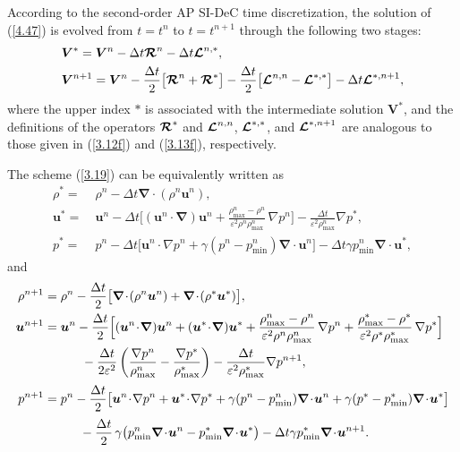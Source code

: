\documentclass[A4paper,12pt,twoside]{article}
\numberwithin{equation}{section}
\numberwithin{figure}{section}
\numberwithin{table}{section}
\def\bnabla{\bm{\nabla}}
\newcommand{\dt}{\Delta t}
\newcommand{\ve}{\varepsilon}
\newcommand\eref[1]{(\ref{#1})}
\begin{document}
According to the second-order AP SI-DeC time discretization, the solution of \eref{4.47} is evolved from $t=t^n$ to $t=t^{n+1}$ through the
following two stages:
\begin{equation}
\begin{aligned}
&\bm V^*=\bm V^n-\dt\bm{{\cal R}}^n-\dt\bm{{\cal L}}^{n,*},\\
&\bm V^{n+1}=\bm V^n-\frac{\dt}{2}\big[\bm{{\cal R}}^n+\bm{{\cal R}}^*\big]-\frac{\dt}{2}\big[\bm{{\cal L}}^{n,n}-\bm{{\cal L}}^{*,*}\big]
-\dt\bm{{\cal L}}^{*,n+1},
\end{aligned}
\label{3.19}
\end{equation}
where the upper index $*$ is associated with the intermediate solution $\bm V^*$, and the definitions of the operators $\bm{{\cal R}}^*$ and
$\bm{{\cal L}}^{n,n}$, $\bm{{\cal L}}^{*,*}$, and $\bm{{\cal L}}^{*,n+1}$ are analogous to those given in \eref{3.12f} and \eref{3.13f},
respectively.

The scheme \eref{3.19} can be equivalently written as
\begin{equation}
\begin{aligned}
\rho^*=&~\rho^n-\dt\bnabla\!\cdot\!(\rho^n\bm u^n),\\
\bm u^*=&~\bm u^n-\dt\Big[(\bm u^n\!\cdot\!\bnabla)\bm u^n+\frac{\rho_{\max}^n-\rho^n}{\ve^2\rho^n\rho_{\max}^n}\,\nabla p^n\Big]-
\frac{\dt}{\ve^2\rho_{\max}^n}\nabla p^*,\\
p^*=&~p^n-\dt\big[\bm u^n\!\cdot\!\nabla p^n+\gamma(p^n-p_{\min}^n)\bnabla\!\cdot\!\bm u^n\big]-\dt\gamma p_{\min}^n\bnabla\!\cdot\!\bm u^*,
\end{aligned}
\label{3.20}
\end{equation}
and
\begin{equation}
\begin{aligned}
\rho^{n+1}&=\rho^n-\frac{\dt}{2}\big[\bnabla\!\cdot\!(\rho^n\bm u^n)+\bnabla\!\cdot\!(\rho^*\bm u^*)\big],\\
\bm u^{n+1}&=\bm u^n-\frac{\dt}{2}\Big[(\bm u^n\!\cdot\!\bnabla)\bm u^n+(\bm u^*\!\cdot\!\bnabla)\bm u^*
+\frac{\rho_{\max}^n-\rho^n}{\ve^2\rho^n\rho_{\max}^n}\,\nabla p^n+\frac{\rho_{\max}^*-\rho^*}{\ve^2\rho^*\rho_{\max}^*}\,\nabla p^*\Big]\\
&\hspace*{1.05cm}-\frac{\dt}{2\ve^2}\left(\frac{\nabla p^n}{\rho^n_{\max}}-\frac{\nabla p^*}{\rho^*_{\max}}\right)-
\frac{\dt}{\ve^2\rho_{\max}^*}\nabla p^{n+1},\\[0.5ex]
p^{n+1}&=p^n-\frac{\dt}{2}\big[\bm u^n\!\cdot\!\nabla p^n+\bm u^*\!\cdot\!\nabla p^*+\gamma(p^n-p_{\min}^n)\bnabla\!\cdot\!\bm u^n
+\gamma(p^*-p_{\min}^*)\bnabla\!\cdot\!\bm u^*\big]\\[0.5ex]
&\hspace*{1.0cm}-\frac{\dt}{2}\,\gamma\big(p_{\min}^n\bnabla\!\cdot\!\bm u^n-p_{\min}^*\bnabla\!\cdot\!\bm u^*\big)
-\dt\gamma p_{\min}^*\bnabla\!\cdot\!\bm u^{n+1}.
\end{aligned}
\label{3.21}
\end{equation}
\end{document}
